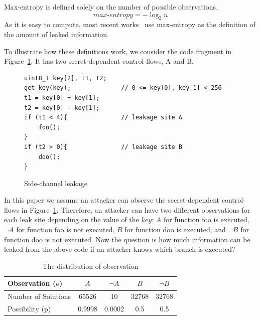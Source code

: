 Max-entropy is defined solely on the number of possible observations.
\begin{displaymath}
    \mathit{max\text{-}entropy} = -\log_2{n}
\end{displaymath}
As it is easy to compute, most recent works~\cite{182946,Doychev:2017:RAS:3062341.3062388} use max-entropy as the definition of
the amount of leaked information.

To illustrate how these definitions work, we consider the code
fragment in Figure~\ref{fig:side-channel}. It has two secret-dependent
control-flows, A and B.

\begin{figure}[h!]
    \centering
    \begin{lstlisting}[xleftmargin=.2\textwidth, xrightmargin=.2\textwidth]
uint8_t key[2], t1, t2;
get_key(key);              // 0 <= key[0], key[1] < 256
t1 = key[0] + key[1];
t2 = key[0] - key[1];
if (t1 < 4){               // leakage site A
    foo();    
}                          
if (t2 > 0){               // leakage site B     
    doo();    
}                          
\end{lstlisting}
    \vspace*{-1pt}
    \caption{Side-channel leakage}
    \label{fig:side-channel}
\end{figure}
In this paper we assume an attacker can observe the secret-dependent control-flows in Figure~\ref{fig:side-channel}.
Therefore, an attacker can have two different observations for each leak site
depending on the value of the $\mathit{key}$: $A$ for function \textsf{foo} is executed,
$\neg A$ for function \textsf{foo} is not executed, $B$ for function \textsf{doo} is
executed, and $\neg B$ for function \textsf{doo} is not executed. Now the
question is how much information can be leaked from the above code if an
attacker knows which branch is executed?

\begin{table}[ht]
    \centering\small\footnotesize
    \caption{The distribution of observation}\label{shtable}
    \begin{tabular}{l|cc|cc}
        \hline

        Observation ($o$)   & $A$    & $\neg A$ & $B$   & $\neg B$ \\ \hline
        Number of Solutions & 65526  & 10       & 32768 & 32768    \\ \hline
        Possibility (p)     & 0.9998 & 0.0002   & 0.5   & 0.5      \\
        \hline
    \end{tabular}
\end{table}

